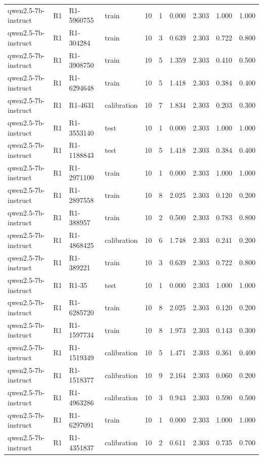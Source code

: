 \begin{table}
\begin{tabular}{llllrrrrrr}
qwen2.5-7b-instruct & R1 & R1-5960755 & train & 10 & 1 & 0.000 & 2.303 & 1.000 & 1.000 \\
qwen2.5-7b-instruct & R1 & R1-304284 & train & 10 & 3 & 0.639 & 2.303 & 0.722 & 0.800 \\
qwen2.5-7b-instruct & R1 & R1-3908750 & train & 10 & 5 & 1.359 & 2.303 & 0.410 & 0.500 \\
qwen2.5-7b-instruct & R1 & R1-6294648 & train & 10 & 5 & 1.418 & 2.303 & 0.384 & 0.400 \\
qwen2.5-7b-instruct & R1 & R1-4631 & calibration & 10 & 7 & 1.834 & 2.303 & 0.203 & 0.300 \\
qwen2.5-7b-instruct & R1 & R1-3553140 & test & 10 & 1 & 0.000 & 2.303 & 1.000 & 1.000 \\
qwen2.5-7b-instruct & R1 & R1-1188843 & test & 10 & 5 & 1.418 & 2.303 & 0.384 & 0.400 \\
qwen2.5-7b-instruct & R1 & R1-2971100 & train & 10 & 1 & 0.000 & 2.303 & 1.000 & 1.000 \\
qwen2.5-7b-instruct & R1 & R1-2897558 & train & 10 & 8 & 2.025 & 2.303 & 0.120 & 0.200 \\
qwen2.5-7b-instruct & R1 & R1-388957 & train & 10 & 2 & 0.500 & 2.303 & 0.783 & 0.800 \\
qwen2.5-7b-instruct & R1 & R1-4868425 & calibration & 10 & 6 & 1.748 & 2.303 & 0.241 & 0.200 \\
qwen2.5-7b-instruct & R1 & R1-389221 & train & 10 & 3 & 0.639 & 2.303 & 0.722 & 0.800 \\
qwen2.5-7b-instruct & R1 & R1-35 & test & 10 & 1 & 0.000 & 2.303 & 1.000 & 1.000 \\
qwen2.5-7b-instruct & R1 & R1-6285720 & train & 10 & 8 & 2.025 & 2.303 & 0.120 & 0.200 \\
qwen2.5-7b-instruct & R1 & R1-1597734 & train & 10 & 8 & 1.973 & 2.303 & 0.143 & 0.300 \\
qwen2.5-7b-instruct & R1 & R1-1519349 & calibration & 10 & 5 & 1.471 & 2.303 & 0.361 & 0.400 \\
qwen2.5-7b-instruct & R1 & R1-1518377 & calibration & 10 & 9 & 2.164 & 2.303 & 0.060 & 0.200 \\
qwen2.5-7b-instruct & R1 & R1-4963286 & calibration & 10 & 3 & 0.943 & 2.303 & 0.590 & 0.500 \\
qwen2.5-7b-instruct & R1 & R1-6297091 & train & 10 & 1 & 0.000 & 2.303 & 1.000 & 1.000 \\
qwen2.5-7b-instruct & R1 & R1-4351837 & calibration & 10 & 2 & 0.611 & 2.303 & 0.735 & 0.700 \\

\end{tabular}
\end{table}
